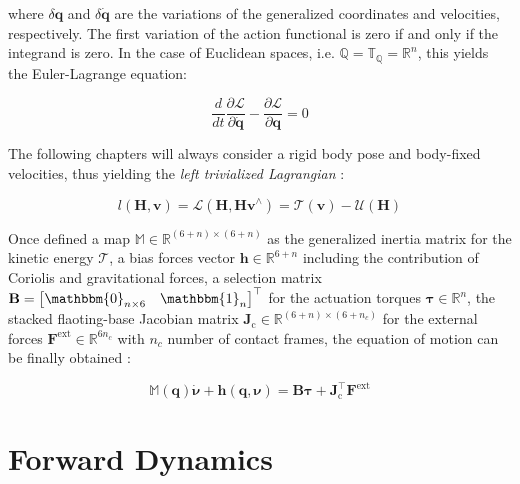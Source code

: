 where $\delta \mathbf{q}$ and $\delta \mathbf{\dot{q}}$ are the variations of the generalized coordinates and velocities, respectively. The first variation of the action functional is zero if and only if the integrand is zero. In the case of Euclidean spaces, i.e. $\mathbb{Q} = \mathbb{T} _{\mathbb{Q}} =\mathbb{R} ^n$, this yields the Euler-Lagrange equation:

\begin{equation}
    \frac{d}{dt} \frac{\partial \mathcal{L}}{\partial \mathbf{\dot{q}}} - \frac{\partial \mathcal{L}}{\partial \mathbf{q}} = 0
    \label{eqn:lagrangian}
\end{equation}

The following chapters will always consider a rigid body pose and body-fixed velocities, thus yielding the \textit{left trivialized Lagrangian} \citep{traversaro_modelling_2019}:

\begin{equation}
    l(\mathbf{H}, \mathbf{v}) = \mathcal{L}(\mathbf{H}, \mathbf{H}\mathbf{v}^\wedge) = \mathcal{T}(\mathbf{v}) - \mathcal{U}(\mathbf{H})
\end{equation}

Once defined a map $\mathbb{M} \in \mathbb{R}^{(6+n) \times (6+n)}$ as the generalized inertia matrix for the kinetic energy $\mathcal{T}$, a bias forces vector $\mathbf{h} \in \mathbb{R} ^{6+n}$ including the contribution of Coriolis and gravitational forces, a selection matrix $\mathbf{B} = \begin{bmatrix} \mathbbm{0}_{n\times6} & \mathbbm{1}_n \end{bmatrix}^\top$ for the actuation torques $\boldsymbol{\tau} \in \mathbb{R} ^n$, the stacked flaoting-base Jacobian matrix $\mathbf{J} _\text{c} \in \mathbb{R} ^{(6+n) \times (6+n_c)}$ for the external forces $\mathbf{F} ^\text{ext} \in \mathbb{R} ^{6n_c}$ with $n_c$ number of contact frames, the equation of motion can be finally obtained \citep{siciliano_handbook_2008}:

\begin{equation}
    \label{eqn:equation_of_motion}
    \mathbb{M}(\mathbf{q}) \mathbf{\dot{\boldsymbol{\nu}}} + \mathbf{h} (\mathbf{q}, \boldsymbol{\nu}) = \mathbf{B}\boldsymbol{\tau} + \mathbf{J}^\top _\text{c} \mathbf{F} ^\text{ext}
\end{equation}


\section{Forward Dynamics}
\label{sec:back_fd}

